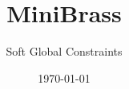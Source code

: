 \documentclass[10pt,xcolor={dvipsnames},fleqn]{beamer}
\title{MiniBrass}
\author{Soft Global Constraints}
\date{\today}
\newcommand{\cemph}[1]{\alert{#1}}
\begin{document}
\titleframe

%
%
%
%
%
%
%
%
%
%
%
%
%
\end{document}
